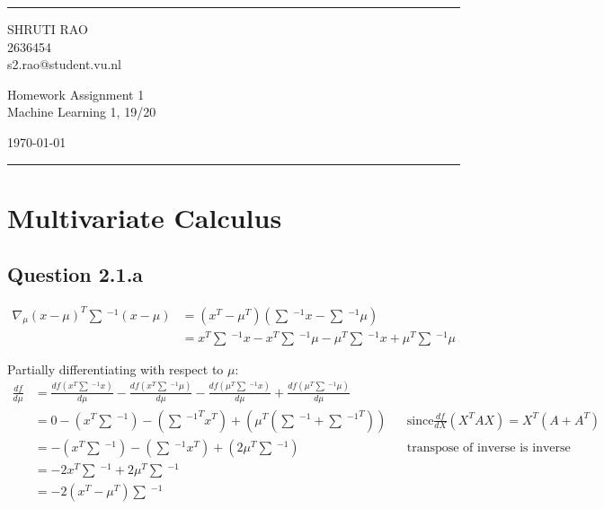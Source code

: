 \documentclass[a4paper]{article}
\begin{document}

\fancyhead[C]{}
\hrule \medskip %
\begin{minipage}{0.295\textwidth} 
\raggedright
\footnotesize
SHRUTI RAO \hfill\\   
2636454 \hfill\\
s2.rao@student.vu.nl
\end{minipage}
\begin{minipage}{0.4\textwidth} 
\centering 
\large 
Homework Assignment 1\\ 
\normalsize 
Machine Learning 1, 19/20\\ 
\end{minipage}
\begin{minipage}{0.295\textwidth} 
\raggedleft
\today\hfill\\
\end{minipage}
\medskip\hrule 
\bigskip


\section*{Multivariate Calculus}
\subsection*{Question 2.1.a}
\begin{align*}
    \nabla_\mu (x - \mu)^T\sum\ ^{-1}(x-\mu) &= (x^T - \mu^T)(\sum\ ^{-1}x - \sum\ ^{-1}\mu) \\
    &= x^T\sum\ ^{-1}x - x^T\sum\ ^{-1}\mu - \mu^T\sum\ ^{-1}x + \mu^T\sum\ ^{-1}\mu
\end{align*}{}

Partially differentiating with respect to $\mu$:
\begin{align*}
    \frac{df}{d\mu} &= \frac{df(x^T\sum\ ^{-1}x)}{d\mu} - \frac{df( x^T\sum\ ^{-1}\mu)}{d\mu} - \frac{df(\mu^T\sum\ ^{-1}x)}{d\mu} + \frac{df(\mu^T\sum\ ^{-1}\mu)}{d\mu} \\
    &= 0 - (x^T\sum\ ^{-1}) - ({\sum\ ^{-1}}^Tx^T) + (\mu^T(\sum\ ^{-1} + {\sum\ ^{-1}}^T )) && \text{since} \frac{df}{dX}(X^TAX) = X^T(A+A^T) \\
    &= -(x^T\sum\ ^{-1}) - (\sum\ ^{-1}x^T) + (2\mu^T\sum\ ^{-1}) && \text{transpose of inverse is inverse} \\
    &= -2x^T\sum\ ^{-1} + 2\mu^T\sum\ ^{-1} \\
    &= -2(x^T - \mu^T)\sum\ ^{-1} 
\end{align*}{}
\end{document}
